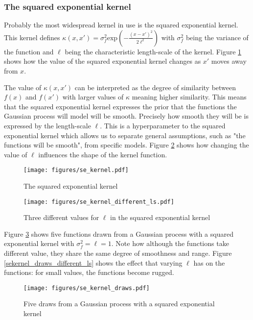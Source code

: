 \documentclass[a4paper,12pt,twoside,openright]{report}
\begin{document}
\subsubsection{The squared exponential kernel}
Probably the most widespread kernel in use is the squared exponential kernel. This kernel defines $\kappa(x, x') = \sigma_f^2 \text{exp}(-\frac{(x-x')^2}{2\ell^2})$ with $\sigma_f^2$ being the variance of the function and $\ell$ being the characteristic length-scale of the kernel. Figure \ref{sekernel} shows how the value of the squared exponential kernel changes as $x'$ moves away from $x$. 

The value of $\kappa(x, x')$ can be interpreted as the degree of similarity between $f(x)$ and $f(x')$ with larger values of $\kappa$ meaning higher similarity. This means that the squared exponential kernel expresses the prior that the functions the Gaussian process will model will be smooth. Precisely how smooth they will be is expressed by the length-scale $\ell$. This is a hyperparameter to the squared exponential kernel which allows us to separate general assumptions, such as "the functions will be smooth", from specific models. Figure \ref{sekernel_ls} shows how changing the value of $\ell$ influences the shape of the kernel function.

\begin{figure}
\centering
  \texttt{[image: figures/se\_kernel.pdf]}
  \caption{The squared exponential kernel}
  \label{sekernel}
\end{figure}

\begin{figure}
\centering
  \texttt{[image: figures/se\_kernel\_different\_ls.pdf]}
  \caption{Three different values for $\ell$ in the squared exponential kernel}
  \label{sekernel_ls}
\end{figure}

Figure \ref{sekernel_draws} shows five functions drawn from a Gaussian process with a squared exponential kernel with $\sigma_f^2 = \ell = 1$. Note how although the functions take different value, they share the same degree of smoothness and range. Figure \ref{sekernel_draws_different_ls} shows the effect that varying $\ell$ has on the functions: for small values, the functions become rugged.


\begin{figure}
\centering
  \texttt{[image: figures/se\_kernel\_draws.pdf]}
  \caption{Five draws from a Gaussian process with a squared exponential kernel}
  \label{sekernel_draws}
\end{figure}
\end{document}
